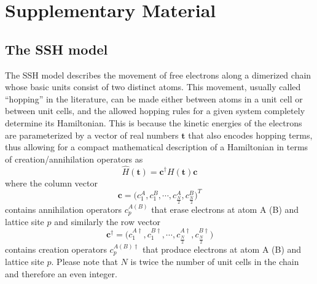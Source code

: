 \documentclass[10pt]{revtex4-1}
\begin{document}
\section*{Supplementary Material}
\subsection*{The SSH model}
\label{sshapp}

The SSH model  describes the movement of free electrons along a dimerized chain whose basic units consist of two distinct atoms. This movement, usually called ``hopping'' in the literature, can be made either between atoms in a unit cell or between unit cells, and the allowed hopping rules for a given system completely determine its Hamiltonian. This is because the kinetic energies of the electrons are parameterized by a vector of real numbers $\mathbf{t}$ that also encodes hopping terms, thus allowing for a compact mathematical description of a Hamiltonian in terms of creation/annihilation operators as
\begin{equation}
\label{SSH}
\hat{H}(\mathbf{t})=\mathbf{c}^{\dagger}H(\mathbf{t})\mathbf{c}
\end{equation}
where the column vector
\begin{equation*}
\mathbf{c} =\Big(c^{A}_1,c^{B}_1,\cdots,c^{A}_\frac{N}{2},c^{B}_\frac{N}{2}\Big)^T
\end{equation*}
contains annihilation operators $c^{A(B)}_p$ that erase electrons at atom A (B) and lattice site $p$ and similarly the row vector
\begin{equation*}
\mathbf{c}^\dagger =\Big(c^{A\dagger}_1,c^{B\dagger}_1,\cdots,c^{A\dagger}_\frac{N}{2},c^{B\dagger}_\frac{N}{2}\Big)
\end{equation*}
contains creation operators $c^{A(B)\dagger}_p$ that produce electrons at atom A (B) and lattice site $p$. Please note that $N$ is twice the number of unit cells in the chain and therefore an even integer.
\end{document}
